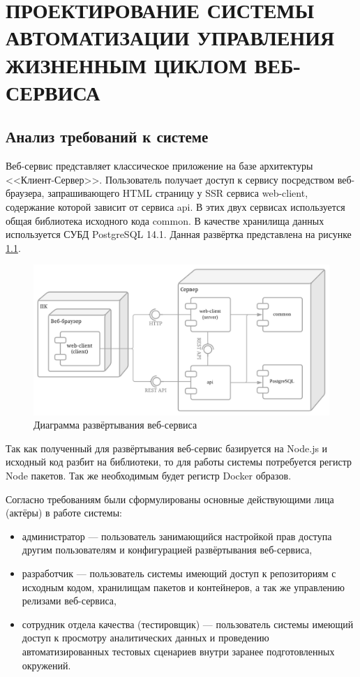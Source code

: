 \chapter{ПРОЕКТИРОВАНИЕ СИСТЕМЫ АВТОМАТИЗАЦИИ УПРАВЛЕНИЯ ЖИЗНЕННЫМ ЦИКЛОМ ВЕБ-СЕРВИСА}
\label{cha:design}

\section{Анализ требований к системе}

Веб-сервис представляет классическое приложение на базе архитектуры <<Клиент-Сервер>>.
Пользователь получает доступ к сервису посредством веб-браузера, запрашивающего HTML страницу у SSR сервиса web-client,
содержание которой зависит от сервиса api.
В этих двух сервисах используется общая библиотека исходного кода common.
В качестве хранилища данных используется СУБД PostgreSQL 14.1.
Данная развёртка представлена на рисунке \ref{fig:deploy-diagram}.

\begin{figure}[ht]
    \centering
    \includegraphics[scale=0.225]{src/figures/deploy-diagram}
    \caption{Диаграмма развёртывания веб-сервиса}
    \label{fig:deploy-diagram}
\end{figure}

Так как полученный для развёртывания веб-сервис базируется на Node.js и исходный код разбит на библиотеки, то для работы системы потребуется регистр Node пакетов.
Так же необходимым будет регистр Docker образов.

Согласно требованиям были сформулированы основные действующими лица (актёры) в работе системы:
\begin{itemize}
    \item администратор --- пользователь занимающийся настройкой прав доступа другим пользователям
        и конфигурацией развёртывания веб-сервиса,
    \item разработчик --- пользователь системы имеющий доступ к репозиториям с исходным кодом,
        хранилищам пакетов и контейнеров, а так же управлению релизами веб-сервиса,
    \item сотрудник отдела качества (тестировщик) --- пользователь системы имеющий доступ к просмотру аналитических данных и
        проведению автоматизированных тестовых сценариев внутри заранее подготовленных окружений.
\end{itemize}

